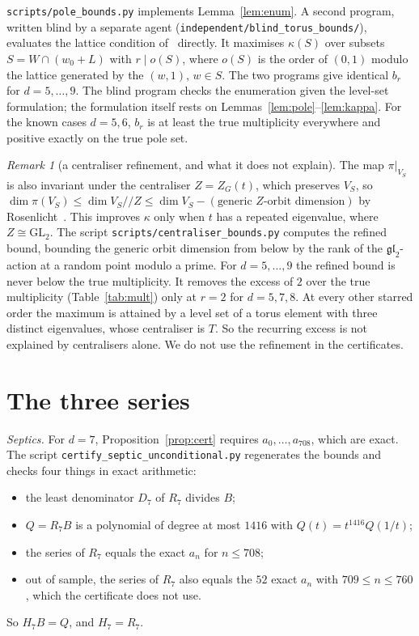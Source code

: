 \documentclass[11pt]{amsart}
\theoremstyle{definition}
\theoremstyle{remark}
\newtheorem{remark}[theorem]{Remark}
\newcommand{\GL}{\mathrm{GL}}
\begin{document}
\texttt{scripts/pole\_bounds.py} implements Lemma~\ref{lem:enum}. A second program, written blind by a separate agent (\texttt{independent/blind\_torus\_bounds/}), evaluates the lattice condition of~\cite[Thm.~5.1]{Der05} directly. It maximises $\kappa(S)$ over subsets $S=W\cap(w_0+L)$ with $r\mid o(S)$, where $o(S)$ is the order of $(0,1)$ modulo the lattice generated by the $(w,1)$, $w\in S$. The two programs give identical $b_r$ for $d=5,\dots,9$. The blind program checks the enumeration given the level-set formulation; the formulation itself rests on Lemmas~\ref{lem:pole}--\ref{lem:kappa}. For the known cases $d=5,6$, $b_r$ is at least the true multiplicity everywhere and positive exactly on the true pole set.

\begin{remark}[a centraliser refinement, and what it does not explain]\label{rem:centraliser}
The map $\pi|_{V_S}$ is also invariant under the centraliser $Z=Z_G(t)$, which preserves $V_S$, so $\dim\pi(V_S)\le\dim V_S/\!/Z\le\dim V_S-(\text{generic $Z$-orbit dimension})$ by Rosenlicht~\cite{Ros56}. This improves $\kappa$ only when $t$ has a repeated eigenvalue, where $Z\cong\GL_2$. The script \texttt{scripts/centraliser\_bounds.py} computes the refined bound, bounding the generic orbit dimension from below by the rank of the $\mathfrak{gl}_2$-action at a random point modulo a prime. For $d=5,\dots,9$ the refined bound is never below the true multiplicity. It removes the excess of $2$ over the true multiplicity (Table~\ref{tab:mult}) only at $r=2$ for $d=5,7,8$. At every other starred order the maximum is attained by a level set of a torus element with three distinct eigenvalues, whose centraliser is $T$. So the recurring excess is not explained by centralisers alone. We do not use the refinement in the certificates.
\end{remark}

\section{The three series}\label{sec:proofs}

\emph{Septics.} For $d=7$, Proposition~\ref{prop:cert} requires $a_0,\dots,a_{708}$, which are exact. The script \texttt{certify\_septic\_unconditional.py} regenerates the bounds and checks four things in exact arithmetic:
\begin{itemize}
\item the least denominator $D_7$ of $R_7$ divides $B$;
\item $Q=R_7B$ is a polynomial of degree at most $1416$ with $Q(t)=t^{1416}Q(1/t)$;
\item the series of $R_7$ equals the exact $a_n$ for $n\le708$;
\item out of sample, the series of $R_7$ also equals the $52$ exact $a_n$ with $709\le n\le760$, which the certificate does not use.
\end{itemize}
So $H_7B=Q$, and $H_7=R_7$.
\end{document}

